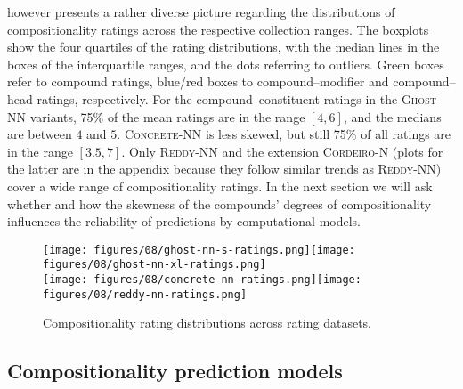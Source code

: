 \documentclass[output=paper,colorlinks,citecolor=brown]{langscibook}
\begin{document}
 however presents a rather diverse picture regarding the distributions of compositionality ratings across the respective collection ranges. The boxplots show the four quartiles of the rating distributions, with the median lines in the boxes of the interquartile ranges, and the dots referring to outliers. Green boxes refer to compound ratings, blue/red boxes to compound--modifier and compound--head ratings, respectively. For the compound--constituent ratings in the \textsc{Ghost-NN} variants, 75\% of the mean ratings are in the range $[4, 6]$, and the medians are between $4$ and $5$. \textsc{Concrete-NN} is less skewed, but still 75\% of all ratings are in the range $[3.5, 7]$. Only \textsc{Reddy-NN} and the extension \textsc{Cordeiro-N} (plots for the latter are in the appendix because they follow similar trends as \textsc{Reddy-NN}) cover a wide range of compositionality ratings. In the next section we will ask whether and how the skewness of the compounds' degrees of compositionality influences the reliability of predictions by computational models.


\begin{figure}
    \texttt{[image: figures/08/ghost-nn-s-ratings.png]}\texttt{[image: figures/08/ghost-nn-xl-ratings.png]}\smallskip\\
    \texttt{[image: figures/08/concrete-nn-ratings.png]}\texttt{[image: figures/08/reddy-nn-ratings.png]}
    \caption{Compositionality rating distributions across rating datasets.}\label{page:comp-ratings}\label{fig:comp-ratings}
\end{figure}

\subsection{Compositionality prediction models}
\label{sec:overview-models}
\end{document}
